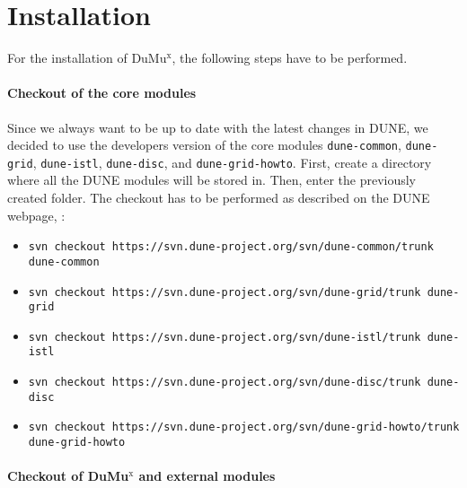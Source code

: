 \section{Installation} 

For the installation of DuMu$^\text{x}$, the following steps have to be performed.  

\paragraph{Checkout of the core modules}
Since we always want to be up to date with the latest changes in DUNE, 
we decided to use the developers version of the core modules 
\texttt{dune-common}, \texttt{dune-grid}, \texttt{dune-istl}, \texttt{dune-disc}, 
and \texttt{dune-grid-howto}. First, create a directory where all the DUNE modules will be stored in. Then, enter the previously created folder. The checkout has to be performed as described on 
the DUNE webpage, \cite{DUNE-HP}: 
\begin{itemize}
\item \texttt{svn checkout https://svn.dune-project.org/svn/dune-common/trunk dune-common}
\item \texttt{svn checkout https://svn.dune-project.org/svn/dune-grid/trunk dune-grid}
\item \texttt{svn checkout https://svn.dune-project.org/svn/dune-istl/trunk dune-istl}
\item \texttt{svn checkout https://svn.dune-project.org/svn/dune-disc/trunk dune-disc}
\item \texttt{svn checkout https://svn.dune-project.org/svn/dune-grid-howto/trunk dune-grid-howto}
\end{itemize} 

\paragraph{Checkout of DuMu$^\text{x}$ and external modules} 

